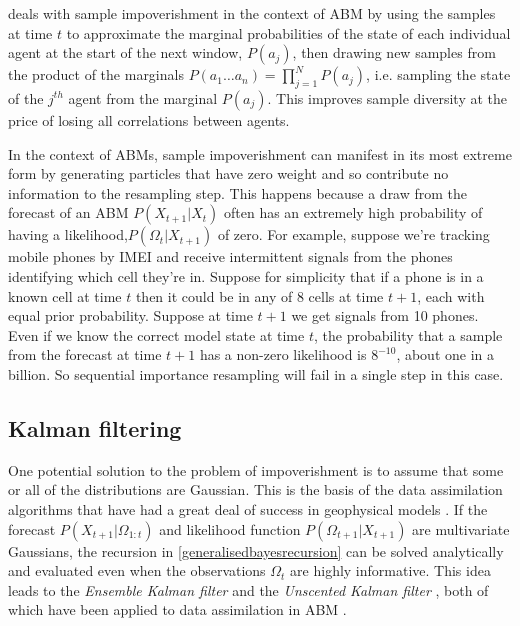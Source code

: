 \documentclass{article}
\begin{document}
\citet{wang_data_2015} deals with sample impoverishment in the context of ABM by using the samples at time $t$ to approximate the marginal probabilities of the state of each individual agent at the start of the next window, $P(a_j)$, then drawing new samples from the product of the marginals $P(a_1 \dots a_n) = \prod_{j=1}^NP(a_j)$, i.e. sampling the state of the $j^{th}$ agent from the marginal $P(a_j)$. This improves sample diversity at the price of losing all correlations between agents. 

In the context of ABMs, sample impoverishment can manifest in its most extreme form by generating particles that have zero weight and so contribute no information to the resampling step. This happens because a draw from the forecast of an ABM $P(X_{t+1}|X_t)$ often has an extremely high probability of having a likelihood,$P(\Omega_t|X_{t+1})$ of zero. For example, suppose we're tracking mobile phones by IMEI and receive intermittent signals from the phones identifying which cell they're in. Suppose for simplicity that if a phone is in a known cell at time $t$ then it could be in any of 8 cells at time $t+1$, each with equal prior probability. Suppose at time $t+1$ we get signals from 10 phones. Even if we know the correct model state at time $t$, the probability that a sample from the forecast at time $t+1$ has a non-zero likelihood is $8^{-10}$, about one in a billion. So sequential importance resampling will fail in a single step in this case.

\subsection{Kalman filtering}
One potential solution to the problem of impoverishment is to assume that some or all of the distributions are Gaussian. This is the basis of the data assimilation algorithms that have had a great deal of success in geophysical models \citep*{carrassi2018data, talagrand_assimilation_1997, kalnay_atmospheric_2003, lewis_dynamic_2006}. If the forecast $P(X_{t+1}|\Omega_{1:t})$ and likelihood function $P(\Omega_{t+1}|X_{t+1})$ are multivariate Gaussians, the recursion in \eqref{generalisedbayesrecursion} can be solved analytically and evaluated even when the observations $\Omega_t$ are highly informative. This idea leads to the \textit{Ensemble Kalman filter} \citep{evensen2003ensemble} and the \textit{Unscented Kalman filter} \citep{wan2001unscented}, both of which have been applied to data assimilation in ABM \citep*{ward_dynamic_2016, clay_realtime_2020}.
\end{document}
